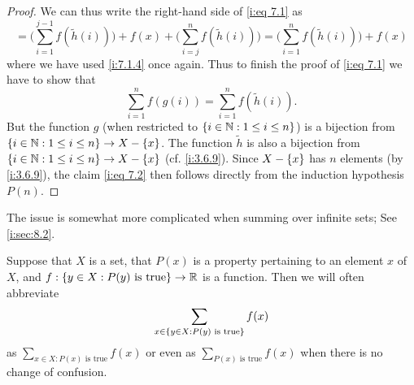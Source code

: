 \begin{proof}
  We can thus write the right-hand side of \cref{i:eq 7.1} as
  \[
    = \Bigg(\sum_{i = 1}^{j - 1} f(\tilde{h}(i))\Bigg) + f(x) + \Bigg(\sum_{i = j}^n f(\tilde{h}(i))\Bigg) = \Bigg(\sum_{i = 1}^n f(\tilde{h}(i))\Bigg) + f(x)
  \]
  where we have used \cref{i:7.1.4} once again.
  Thus to finish the proof of \cref{i:eq 7.1} we have to show that
  \[
    \sum_{i = 1}^n f(g(i)) = \sum_{i = 1}^n f(\tilde{h}(i)). \tag{i:7.2}\label{i:eq 7.2}
  \]
  But the function \(g\) (when restricted to \(\left\lbrace i \in \mathbb{N} : 1 \leq i \leq n\right\rbrace\)) is a bijection from \(\left\lbrace i \in \mathbb{N} : 1 \leq i \leq n\right\rbrace \to X - \left\lbrace x\right\rbrace\).
  The function \(\tilde{h}\) is also a bijection from \(\left\lbrace i \in \mathbb{N} : 1 \leq i \leq n\right\rbrace \to X - \left\lbrace x\right\rbrace\) (cf. \cref{i:3.6.9}).
  Since \(X - \left\lbrace x\right\rbrace\) has \(n\) elements (by \cref{i:3.6.9}), the claim \cref{i:eq 7.2} then follows directly from the induction hypothesis \(P(n)\).
\end{proof}

\begin{rmk}\label{i:7.1.9}
  The issue is somewhat more complicated when summing over infinite sets;
  See \cref{i:sec:8.2}.
\end{rmk}

\begin{rmk}\label{i:7.1.10}
  Suppose that \(X\) is a set, that \(P(x)\) is a property pertaining to an element \(x\) of \(X\), and \(f : \left\lbrace y \in X : P(y) \text{ is true}\right\rbrace \to \mathbb{R}\) is a function.
  Then we will often abbreviate
  \[
    \sum_{x \in \left\lbrace y \in X : P(y) \text{ is true}\right\rbrace} f(x)
  \]
  as \(\sum_{x \in X : P(x) \text{ is true}} f(x)\) or even as \(\sum_{P(x) \text{ is true}} f(x)\) when there is no change of confusion.
\end{rmk}

